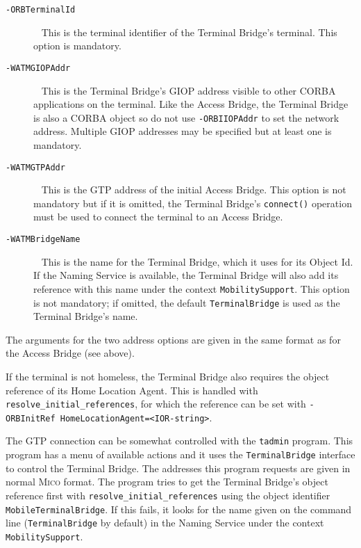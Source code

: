 \documentclass[12pt,a4paper,draft]{article}
\newcommand{\MICO}{\textsc{Mico}}
\begin{document}
\begin{description}
\item[\texttt{-ORBTerminalId}] 
  ~\newline
  This is the terminal identifier of the Terminal Bridge's terminal.
  This option is mandatory.
\item[\texttt{-WATMGIOPAddr}] 
  ~\newline
  This is the Terminal Bridge's GIOP address visible to other CORBA
  applications on the terminal.  Like the Access Bridge, the Terminal
  Bridge is also a CORBA object so do not use \texttt{-ORBIIOPAddr} to
  set the network address.  Multiple GIOP addresses may be specified
  but at least one is mandatory.
\item[\texttt{-WATMGTPAddr}] 
  ~\newline
  This is the GTP address of the initial Access Bridge.  This option
  is not mandatory but if it is omitted, the Terminal Bridge's
  \texttt{connect()} operation must be used to connect the terminal to
  an Access Bridge.
\item[\texttt{-WATMBridgeName}] 
  ~\newline
  This is the name for the Terminal Bridge, which it uses for its
  Object Id.  If the Naming Service is available, the Terminal Bridge
  will also add its reference with this name under the context
  \texttt{Mobi\-lity\-Sup\-port}.  This option is not mandatory; if
  omitted, the default \texttt{TerminalBridge} is used as the Terminal
  Bridge's name.
\end{description}

The arguments for the two address options are given in the same format
as for the Access Bridge (see above).

If the terminal is not homeless, the Terminal Bridge also requires the
object reference of its Home Location Agent.  This is handled with
\texttt{resolve\_initial\_references}, for which the reference can be
set with \texttt{-ORBInitRef HomeLocationAgent=<IOR-string>}.

The GTP connection can be somewhat controlled with the \texttt{tadmin}
program.  This program has a menu of available actions and it uses the
\texttt{TerminalBridge} interface to control the Terminal Bridge.  The
addresses this program requests are given in normal \MICO{} format.
The program tries to get the Terminal Bridge's object reference first
with \texttt{resolve\_initial\_references} using the object identifier
\texttt{MobileTerminalBridge}.  If this fails, it looks for the name
given on the command line (\texttt{TerminalBridge} by default) in the
Naming Service under the context \texttt{MobilitySupport}.
\end{document}
